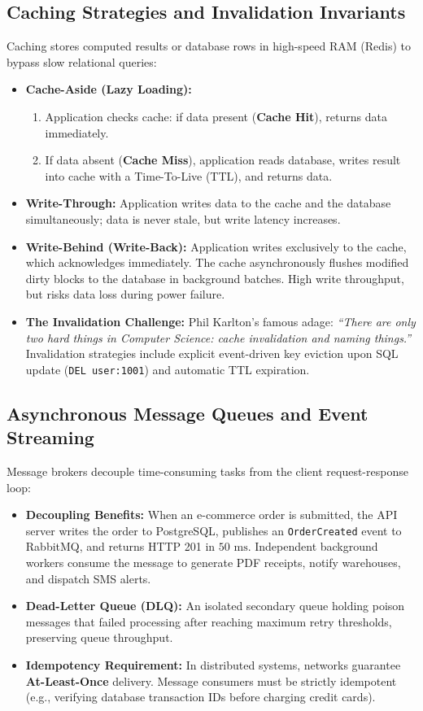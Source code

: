 \subsection{Caching Strategies and Invalidation Invariants}
Caching stores computed results or database rows in high-speed RAM (Redis) to bypass slow relational queries:
\begin{itemize}
    \item \textbf{Cache-Aside (Lazy Loading):}
    \begin{enumerate}
        \item Application checks cache: if data present (\textbf{Cache Hit}), returns data immediately.
        \item If data absent (\textbf{Cache Miss}), application reads database, writes result into cache with a Time-To-Live (TTL), and returns data.
    \end{enumerate}
    \item \textbf{Write-Through:} Application writes data to the cache and the database simultaneously; data is never stale, but write latency increases.
    \item \textbf{Write-Behind (Write-Back):} Application writes exclusively to the cache, which acknowledges immediately. The cache asynchronously flushes modified dirty blocks to the database in background batches. High write throughput, but risks data loss during power failure.
    \item \textbf{The Invalidation Challenge:} Phil Karlton's famous adage: \textit{``There are only two hard things in Computer Science: cache invalidation and naming things.''} Invalidation strategies include explicit event-driven key eviction upon SQL update (\texttt{DEL user:1001}) and automatic TTL expiration.
\end{itemize}

\subsection{Asynchronous Message Queues and Event Streaming}
Message brokers decouple time-consuming tasks from the client request-response loop:
\begin{itemize}
    \item \textbf{Decoupling Benefits:} When an e-commerce order is submitted, the API server writes the order to PostgreSQL, publishes an \texttt{OrderCreated} event to RabbitMQ, and returns HTTP 201 in $50\text{ ms}$. Independent background workers consume the message to generate PDF receipts, notify warehouses, and dispatch SMS alerts.
    \item \textbf{Dead-Letter Queue (DLQ):} An isolated secondary queue holding poison messages that failed processing after reaching maximum retry thresholds, preserving queue throughput.
    \item \textbf{Idempotency Requirement:} In distributed systems, networks guarantee \textbf{At-Least-Once} delivery. Message consumers must be strictly idempotent (e.g., verifying database transaction IDs before charging credit cards).
\end{itemize}

